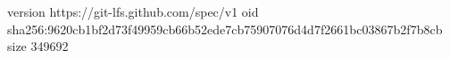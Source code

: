 version https://git-lfs.github.com/spec/v1
oid sha256:9620cb1bf2d73f49959cb66b52ede7cb75907076d4d7f2661bc03867b2f7b8cb
size 349692
